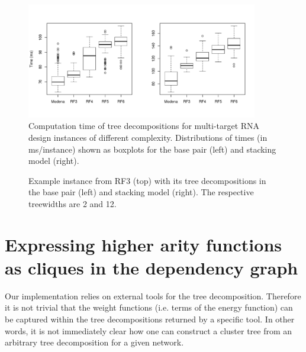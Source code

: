 \documentclass{bioinfo}
\makeatletter
\newlength{\@aligneps}
\newcommand{\includegraphicstop}[2][]{%
\sbox{\@alignepsbox}{\texttt{[image: \#2]}}%
\setlength{\@aligneps}{-\ht\@alignepsbox}%
\addtolength{\@aligneps}{2ex}%
\raisebox{\@aligneps}{\usebox{\@alignepsbox}}}
\makeatother
\begin{document}
\begin{figure}
  \centering
  \includegraphics[width=0.9\textwidth]{Figs/td-times}
  \vspace*{-24pt}
  \caption{Computation time of tree decompositions for
    multi-target RNA design instances of different complexity.
    Distributions of times (in ms/instance) shown as boxplots for the base pair (left) and stacking model (right).}
  \label{fig:td-times}
\end{figure}


\begin{figure}[t!]
  \centering
  
  \includegraphicstop[width=0.6\textwidth]{Figs/td-example-basepair}%
  \includegraphicstop[width=0.35\textwidth]{Figs/td-example-stacking}
  \caption{Example instance from RF3 (top) with its tree decompositions in the base pair (left) and stacking model (right). The respective treewidths are 2 and 12.}
  \label{fig:td-example}
\end{figure}

\section{Expressing higher arity functions as cliques in the dependency graph}
\label{appsec:dependency-cliques}

Our implementation relies on external tools for the tree decomposition. Therefore it is not trivial that the weight functions (i.e. terms of the energy function) can be captured within the tree decompositions returned by a specific tool. In other words, it is not immediately clear how one can construct a cluster tree from an arbitrary tree decomposition for a given network. 
\end{document}
